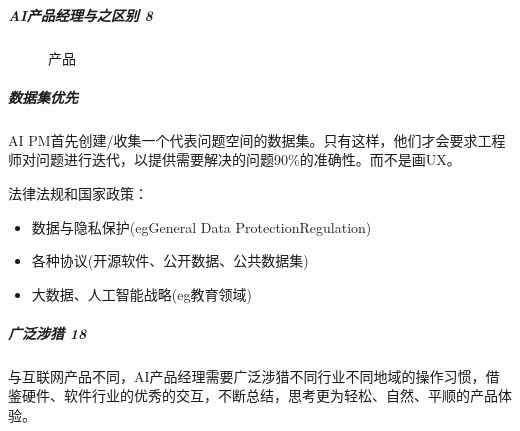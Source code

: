 \documentclass[letterpaper,10pt,english]{sphinxmanual}
\begin{document}
\subparagraph{AI产品经理与之区别 8\sphinxfootnotemark[264]}
\label{\detokenize{chapter_introduction/AI_PM:ai-8}}%
\begin{footnotetext}[264]\sphinxAtStartFootnote
{}
%
\end{footnotetext}\ignorespaces 
\begin{figure}[H]
\centering
\capstart

\noindent{}
\caption{产品}\label{\detokenize{chapter_introduction/AI_PM:id48}}\end{figure}


\subparagraph{数据集优先}
\label{\detokenize{chapter_introduction/AI_PM:id5}}
AI
PM首先创建/收集一个代表问题空间的数据集。只有这样，他们才会要求工程师对问题进行迭代，以提供需要解决的问题90\%的准确性。而不是画UX。

%
\begin{footnote}[265]\sphinxAtStartFootnote
{}
%
\end{footnote}

法律法规和国家政策：
%
\begin{footnote}[266]\sphinxAtStartFootnote
{}
%
\end{footnote}
\begin{itemize}
\item {} 
数据与隐私保护(egGeneral Data ProtectionRegulation)

\item {} 
各种协议(开源软件、公开数据、公共数据集)

\item {} 
大数据、人工智能战略(eg教育领域)

\end{itemize}


\subparagraph{广泛涉猎 18\sphinxfootnotemark[267]}
\label{\detokenize{chapter_introduction/AI_PM:id6}}%
\begin{footnotetext}[267]\sphinxAtStartFootnote
{}
%
\end{footnotetext}\ignorespaces 
与互联网产品不同，AI产品经理需要广泛涉猎不同行业不同地域的操作习惯，借鉴硬件、软件行业的优秀的交互，不断总结，思考更为轻松、自然、平顺的产品体验。
\end{document}

